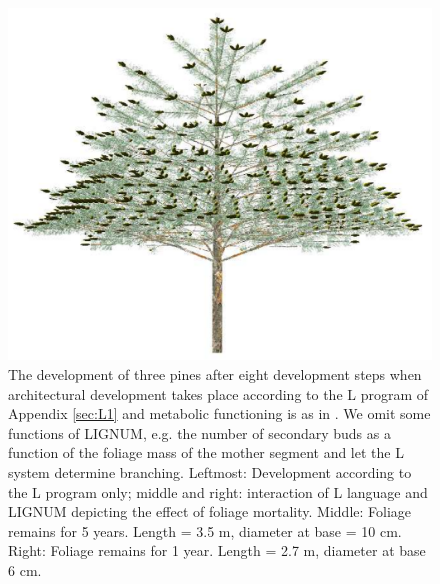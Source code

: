 \begin{figure}
\includegraphics[scale=0.20]{pine8F1}   \caption{The   development  of
three   pines  after  eight   development  steps   when  architectural
development  takes  place  according  to  the L  program  of  Appendix
\ref{sec:L1} and  metabolic functioning is  as in \citet{perttunen:96,
perttunen:98}. We  omit some functions  of LIGNUM, e.g. the  number of
secondary buds as a function of the foliage mass of the mother segment
and  let  the L  system  determine  branching.  Leftmost:  Development
according to  the L program only;  middle and right:  interaction of L
language  and  LIGNUM  depicting  the  effect  of  foliage  mortality.
Middle: Foliage remains for 5 years.  Length = 3.5 m, diameter at base
= 10 cm.  Right: Foliage remains for 1 year.  Length = 2.7 m, diameter
at base 6 cm.}  \label{fig:pine} \end{figure}

